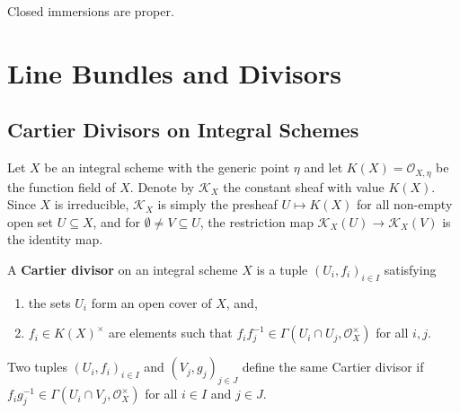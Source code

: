 \documentclass[12pt]{book}
\newcommand{\inlinedef}[1]{\textcolor{oxfordblue}{\bfseries #1}}
\theoremstyle{definition}
\begin{document}
	\begin{proposition}
	Closed immersions are proper.
	\end{proposition}
	
	
	
	\chapter{Line Bundles and Divisors}
	
	\section{Cartier Divisors on Integral Schemes}
	
	Let $X$ be an integral scheme with the generic point $\eta$ and let $K(X) = \mathcal{O}_{X, \eta}$ be the function field of $X$. Denote by $\mathcal{K}_X$ the constant sheaf with value $K(X)$. Since $X$ is irreducible, $\mathcal{K}_X$ is simply the presheaf $U \mapsto K(X)$ for all non-empty open set $U \subseteq X$, and for $\emptyset \neq V \subseteq U$, the restriction map $\mathcal{K}_X(U) \to \mathcal{K}_X(V)$ is the identity map.
	
	\begin{definition}
		A \inlinedef{Cartier divisor} on an integral scheme $X$ is a tuple $(U_i, f_i)_{i \in I}$ satisfying
		\begin{enumerate}
			\item the sets $U_i$ form an open cover of $X$, and,
			\item $f_i \in K(X)^\times$ are elements such that $f_if_j^{-1} \in \Gamma(U_i \cap U_j, \mathcal{O}_X^\times)$ for all $i, j$.
		\end{enumerate}
		
		Two tuples $(U_i, f_i)_{i \in I}$ and $(V_j, g_j)_{j \in J}$ define the same Cartier divisor if $f_ig_j^{-1} \in \Gamma(U_i \cap V_j, \mathcal{O}_X^{\times})$ for all $i \in I$ and $j \in J$.
	\end{definition}
	
\end{document}
